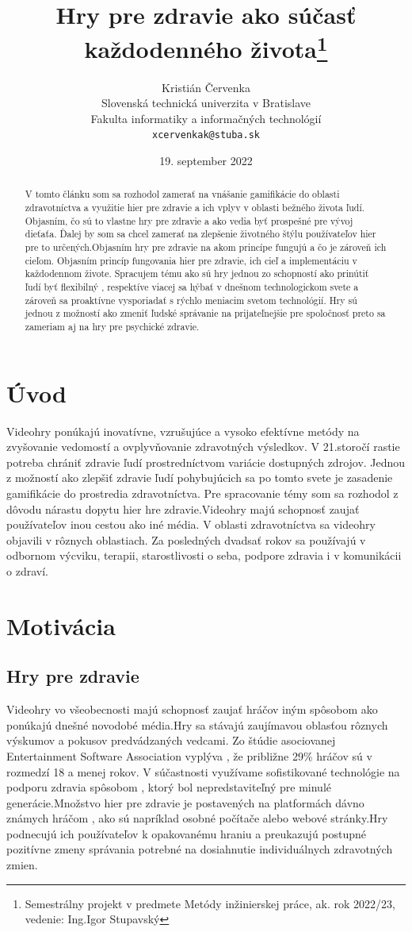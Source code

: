 \documentclass[10pt,oneside,slovak,a4paper]{article}
\title{Hry pre zdravie ako súčasť každodenného života\thanks{Semestrálny projekt v predmete Metódy inžinierskej práce, ak. rok 2022/23, vedenie: Ing.Igor Stupavský}} %
\author{Kristián Červenka\\[2pt]
	{\small Slovenská technická univerzita v Bratislave}\\
	{\small Fakulta informatiky a informačných technológií}\\
	{\small \texttt{xcervenkak@stuba.sk}}
	}
\date{\small 19. september 2022} %
\begin{document}
\maketitle

\begin{abstract}
V tomto článku som sa rozhodol zamerať na vnášanie gamifikácie do oblasti zdravotníctva a využitie hier pre zdravie a ich vplyv v oblasti bežného života ľudí.
Objasním, čo sú to vlastne hry pre zdravie a ako vedia byť prospešné pre vývoj dieťaťa.
Ďalej by som sa chcel zamerať na zlepšenie životného štýlu používateľov hier pre to určených.Objasním hry pre zdravie na akom princípe fungujú a čo je zároveň ich cieľom.
Objasním princíp fungovania hier pre zdravie, ich cieľ a implementáciu v každodennom živote.
Spracujem tému ako sú hry jednou zo schopností ako prinútiť ľudí byť flexibilný , respektíve viacej sa hýbať v dnešnom technologickom svete a zároveň sa proaktívne vysporiadať s rýchlo meniacim svetom technológií. 
Hry sú jednou z možností ako zmeniť ľudské správanie na prijateľnejšie pre spoločnosť preto sa zameriam aj na hry pre psychické zdravie.
\end{abstract}



\section{Úvod}
Videohry ponúkajú inovatívne, vzrušujúce a vysoko efektívne metódy na zvyšovanie vedomostí a ovplyvňovanie zdravotných výsledkov. 
V 21.storočí rastie potreba chrániť zdravie ľudí prostredníctvom variácie dostupných zdrojov.
Jednou z možností ako zlepšiť zdravie ľudí pohybujúcich sa po tomto svete je zasadenie gamifikácie do prostredia zdravotníctva. 
Pre spracovanie témy som sa rozhodol z dôvodu nárastu dopytu hier hre zdravie.Videohry majú schopnosť zaujať používateľov inou cestou ako iné média.
V oblasti zdravotníctva sa videohry objavili v rôznych oblastiach. 
Za posledných dvadsať rokov sa používajú v odbornom výcviku, terapii, starostlivosti o seba, podpore zdravia i v komunikácii o zdraví.


\section{Motivácia} 
\subsection{Hry pre zdravie}
Videohry vo všeobecnosti majú schopnosť zaujať hráčov iným spôsobom ako ponúkajú dnešné novodobé média.Hry sa stávajú zaujímavou oblasťou rôznych výskumov a pokusov predvádzaných vedcami. Zo štúdie asociovanej Entertainment Software Association \cite{PLP-Framework} vyplýva , že približne 29\% hráčov sú v rozmedzí 18 a menej rokov. 
V súčastnosti využívame sofistikované technológie na podporu zdravia spôsobom , ktorý bol nepredstaviteľný pre minulé generácie.Množstvo hier pre zdravie je postavených na platformách dávno známych hráčom , ako sú napríklad osobné počítače alebo webové stránky.Hry podnecujú ich používateľov k opakovanému hraniu a preukazujú postupné  pozitívne zmeny správania potrebné na dosiahnutie individuálnych zdravotných zmien.
\end{document}
